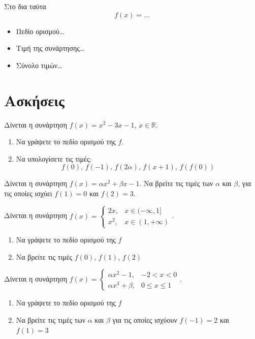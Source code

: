 \documentclass{presentation}
\begin{document}
\begin{frame}{Στο δια ταύτα}
  $$f(x)=\dots$$
  \begin{itemize}
    \item Πεδίο ορισμού\dots
    \item Τιμή της συνάρτησης\dots
    \item Σύνολο τιμών\dots
  \end{itemize}
\end{frame}

\moodle

\section{Ασκήσεις}

\exercises

\begin{askisi}
  Δίνεται η συνάρτηση $f(x)=x^2-3x-1$, $x\in\mathbb{R}$.
  \begin{enumerate}[<+->]
    \item Να γράψετε το πεδίο ορισμού της $f$.
    \item Να υπολογίσετε τις τιμές:
          $$f(0) \text{, } f(-1) \text{, }f(2α) \text{, }f(x+1) \text{, }f\left(f(0)\right) $$
  \end{enumerate}
\end{askisi}

\begin{askisi}
  Δίνεται η συνάρτηση $f(x)=αx^2+βx-1$. Να βρείτε τις τιμές των $α$ και $β$, για τις οποίες ισχύει $f(1)=0$ και $f(2)=3$.
\end{askisi}

\begin{askisi}
  Δίνεται η συνάρτηση $f(x)=
    \begin{cases}
      2x,  & x\in(-\infty,1] \\
      x^2, & x\in(1,+\infty)
    \end{cases}$.
  \begin{enumerate}[<+->]
    \item Να γράψετε το πεδίο ορισμού της $f$
    \item Να βρείτε τις τιμές $f(0)$, $f(1)$, $f(2)$
  \end{enumerate}
\end{askisi}

\begin{askisi}
  Δίνεται η συνάρτηση $f(x)=
    \begin{cases}
      αx^2-1, & -2<x<0      \\
      αx^3+β, & 0\le x\le 1
    \end{cases}$.
  \begin{enumerate}[<+->]
    \item Να γράψετε το πεδίο ορισμού της $f$
    \item Να βρείτε τις τιμές των $α$ και $β$ για τις οποίες ισχύουν $f(-1)=2$ και $f(1)=3$
  \end{enumerate}
\end{askisi}
\end{document}
